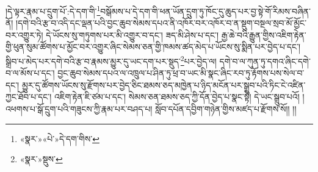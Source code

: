 །དེ་ལྟར་རྣམ་པ་དྲུག་པོ་:དེ་དག་གི་\footnote{«སྣར་»«པེ་»དེ་དག་གིས་}བསྒོམས་པ་དེ་དག་གི་ཕན་ཡོན་དྲུག་ཏུ་ཁོང་དུ་ཆུད་པར་བྱ་སྟེ་གོ་རིམས་བཞིན་ནོ། །དགེ་བའི་རྩ་བ་འདི་དང་ལྡན་པའི་བྱང་ཆུབ་སེམས་དཔའ་ནི་འཁོར་བར་འཁོར་བ་ན་སྡུག་བསྔལ་སྲབ་མོ་མྱོང་བར་འགྱུར་ཏེ། དེ་ཡོངས་སུ་གཏུགས་པར་མི་འགྱུར་བ་དང་། ཟད་མི་ཤེས་པ་དང་། རྒྱ་ཆེ་བའི་རྒྱུན་གྱིས་འཇིག་རྟེན་གྱི་ཕུན་སུམ་ཚོགས་པ་མྱོང་བར་འགྱུར་ཞིང་སེམས་ཅན་གྱི་ཁམས་ཚད་མེད་པ་ཡོངས་སུ་སྨིན་པར་བྱེད་པ་དང་། སྒྲིབ་པ་མེད་པར་དགེ་བའི་རྩ་བ་རྣམས་མྱུར་དུ་ཡང་དག་པར་སྡུད་\footnote{«སྣར་»སྡུས་}པར་བྱེད་ལ། དགེ་བ་ལ་ཀུན་ཏུ་དགའ་ཞིང་དགེ་བ་ལ་མོས་པ་དང་། བྱང་ཆུབ་སེམས་དཔའ་ལ་འཁྲུལ་པ་ཤིན་ཏུ་ཕྲ་བ་ཡང་མི་སྣང་ཞིང་རབ་ཏུ་རྟོགས་པས་སེལ་བ་དང་། མྱུར་དུ་ཚོགས་ཡོངས་སུ་རྫོགས་པར་བྱེད་ཅིང་ཐམས་ཅད་མཁྱེན་པ་ཉིད་མངོན་པར་སྒྲུབ་པའི་ཏིང་ངེ་འཛིན་ཀྱང་ཐོབ་པ་དང་། འཇིག་རྟེན་ཇི་ཙམ་པ་དང་། སེམས་ཅན་ཐམས་ཅད་ཀྱི་དོན་བྱེད་པ་སྣང་སྟེ། དེ་ཡང་སྒྲུབ་པའོ། །འཕགས་པ་སྒོ་དྲུག་པའི་གཟུངས་ཀྱི་རྣམ་པར་བཤད་པ། སློབ་དཔོན་དབྱིག་གཉེན་གྱིས་མཛད་པ་རྫོགས་སོ།། །།